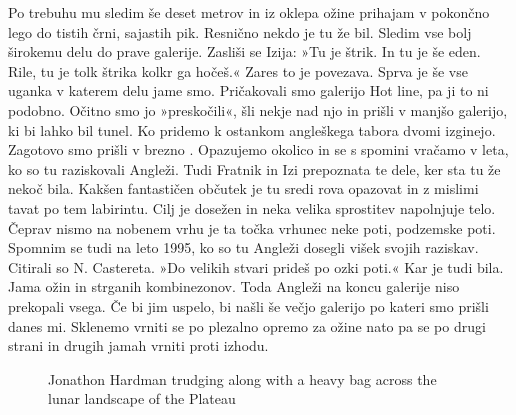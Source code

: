Po trebuhu mu sledim še deset metrov in iz oklepa ožine prihajam v pokončno lego do tistih črni, sajastih pik. Resnično nekdo je tu že bil. Sledim vse bolj širokemu delu do prave galerije. Zasliši se Izija: »Tu je štrik. In tu je še eden. Rile, tu je tolk štrika kolkr ga hočeš.« Zares to je povezava. Sprva je še vse uganka v katerem delu jame smo. Pričakovali smo galerijo Hot line, pa ji to ni podobno. Očitno smo jo »preskočili«, šli nekje nad njo in prišli v manjšo galerijo, ki bi lahko bil  tunel. Ko pridemo k ostankom  angleškega tabora dvomi izginejo.  Zagotovo smo prišli  v brezno . Opazujemo okolico in se s spomini vračamo v leta, ko so tu raziskovali Angleži. Tudi Fratnik in Izi prepoznata te dele, ker sta tu že nekoč bila. Kakšen fantastičen občutek je tu sredi rova opazovat in z mislimi tavat po tem labirintu. Cilj je dosežen in neka velika sprostitev napolnjuje telo. Čeprav nismo na nobenem vrhu je ta točka vrhunec neke poti, podzemske poti. Spomnim se tudi na leto 1995, ko so tu Angleži dosegli višek svojih raziskav. Citirali so N. Castereta. »Do velikih stvari prideš po ozki poti.« Kar je  tudi bila. Jama ožin in strganih kombinezonov. Toda Angleži na koncu galerije niso prekopali vsega. Če bi jim uspelo, bi našli še večjo galerijo po kateri smo prišli danes mi. 
  Sklenemo vrniti se po plezalno opremo za ožine nato pa se po drugi strani in drugih jamah vrniti proti izhodu. 
\begin{figure}[t!]
\checkoddpage \ifoddpage \forcerectofloat \else \forceversofloat \fi
\centering
{}
\caption{Jonathon Hardman trudging along with a heavy bag across the lunar landscape of the  Plateau }
\label{mig surface jon hardman}
\end{figure}

